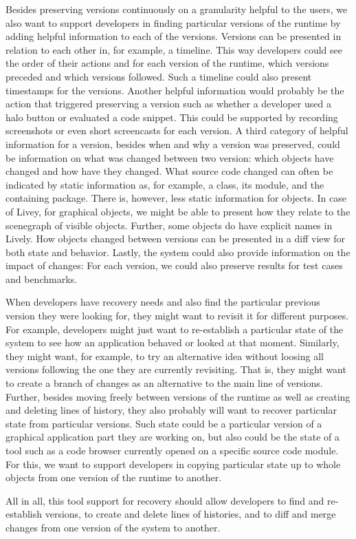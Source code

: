 Besides preserving versions continuously on a granularity helpful to the users, we also want to support developers in finding particular versions of the runtime by adding helpful information to each of the versions.
Versions can be presented in relation to each other in, for example, a timeline.
This way developers could see the order of their actions and for each version of the runtime, which versions preceded and which versions followed.
Such a timeline could also present timestamps for the versions.
Another helpful information would probably be the action that triggered preserving a version such as whether a developer used a halo button or evaluated a code snippet.
This could be supported by recording screenshots or even short screencasts for each version.
A third category of helpful information for a version, besides when and why a version was preserved, could be information on what was changed between two version: which objects have changed and how have they changed.
What source code changed can often be indicated by static information as, for example, a class, its module, and the containing package.
There is, however, less static information for objects.
In case of Livey, for graphical objects, we might be able to present how they relate to the scenegraph of visible objects.
Further, some objects do have explicit names in Lively.
How objects changed between versions can be presented in a diff view for both state and behavior.
Lastly, the system could also provide information on the impact of changes: For each version, we could also preserve results for test cases and benchmarks.

When developers have recovery needs and also find the particular previous version they were looking for, they might want to revisit it for different purposes.
For example, developers might just want to re-establish a particular state of the system to see how an application behaved or looked at that moment.
Similarly, they might want, for example, to try an alternative idea without loosing all versions following the one they are currently revisiting.
That is, they might want to create a branch of changes as an alternative to the main line of versions.
Further, besides moving freely between versions of the runtime as well as creating and deleting lines of history, they also probably will want to recover particular state from particular versions.
Such state could be a particular version of a graphical application part they are working on, but also could be the state of a tool such as a code browser currently opened on a specific source code module.
For this, we want to support developers in copying particular state up to whole objects from one version of the runtime to another.

All in all, this tool support for recovery should allow developers to find and re-establish versions, to create and delete lines of histories, and to diff and merge changes from one version of the system to another.

